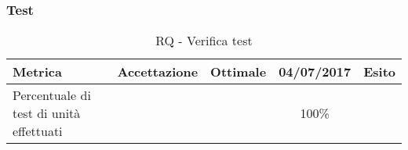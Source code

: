 \documentclass[../PianoDiQualifica.tex]{subfiles}
\begin{document}
				\subsubsection{Test}
						\begin{table}[H]
							\center
							\begin{tabular}{|>{\centering}p{6cm}|c|c|c|c|}
								\hline
								\rowcolor{blue!30}\textbf{Metrica} & \textbf{Accettazione} & \textbf{Ottimale}&\textbf{04/07/2017}&\textbf{Esito} \\ \hline
								Percentuale di test di unità effettuati && &100\% &  \\ \hline
						\end{tabular}
					\caption{RQ - Verifica test}
					\end{table}
\end{document}
